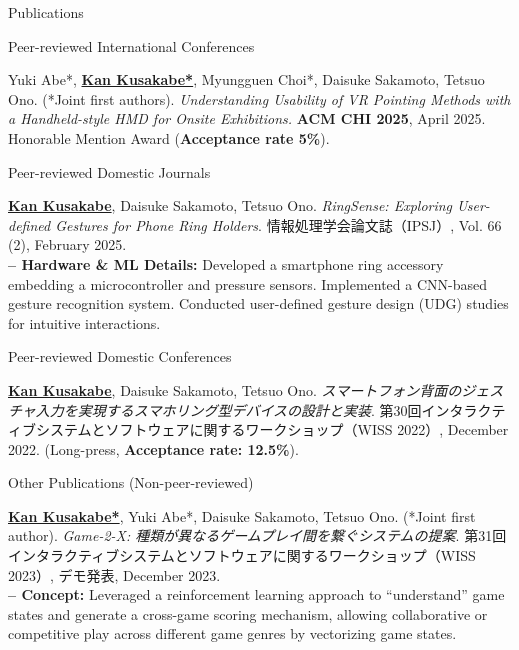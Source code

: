 \documentclass[
    11pt, %
]{resume} %
\begin{document}
\begin{rSection}{Publications}

\begin{rSubsection}{Peer-reviewed International Conferences}{}{}{}
    \item Yuki Abe*, \underline{\textbf{Kan Kusakabe*}}, Myungguen Choi*, Daisuke Sakamoto, Tetsuo Ono. (*Joint first authors).
    \textit{Understanding Usability of VR Pointing Methods with a Handheld-style HMD for Onsite Exhibitions.}
    \textbf{ACM CHI 2025}, April 2025. Honorable Mention Award (\textbf{Acceptance rate 5\%}).
\end{rSubsection}

\begin{rSubsection}{Peer-reviewed Domestic Journals}{}{}{}
    \item \underline{\textbf{Kan Kusakabe}}, Daisuke Sakamoto, Tetsuo Ono.
    \textit{RingSense: Exploring User-defined Gestures for Phone Ring Holders}.
    情報処理学会論文誌（IPSJ）, Vol. 66 (2), February 2025.\\
    \textbf{-- Hardware \& ML Details:} Developed a smartphone ring accessory embedding a microcontroller and pressure sensors. Implemented a CNN-based gesture recognition system. Conducted user-defined gesture design (UDG) studies for intuitive interactions.
\end{rSubsection}

\begin{rSubsection}{Peer-reviewed Domestic Conferences}{}{}{}
    \item \underline{\textbf{Kan Kusakabe}}, Daisuke Sakamoto, Tetsuo Ono.
    \textit{スマートフォン背面のジェスチャ入力を実現するスマホリング型デバイスの設計と実装}.
    第30回インタラクティブシステムとソフトウェアに関するワークショップ（WISS 2022）, December 2022. (Long-press, \textbf{Acceptance rate: 12.5\%}).
\end{rSubsection}

\begin{rSubsection}{Other Publications (Non-peer-reviewed)}{}{}{}
    \item \underline{\textbf{Kan Kusakabe*}}, Yuki Abe*, Daisuke Sakamoto, Tetsuo Ono. (*Joint first author).
    \textit{Game-2-X: 種類が異なるゲームプレイ間を繋ぐシステムの提案}.
    第31回インタラクティブシステムとソフトウェアに関するワークショップ（WISS 2023）, デモ発表, December 2023.\\
    \textbf{-- Concept:} Leveraged a reinforcement learning approach to “understand” game states and generate a cross-game scoring mechanism, allowing collaborative or competitive play across different game genres by vectorizing game states.\\


\end{rSubsection}
\end{rSection}
\end{document}
